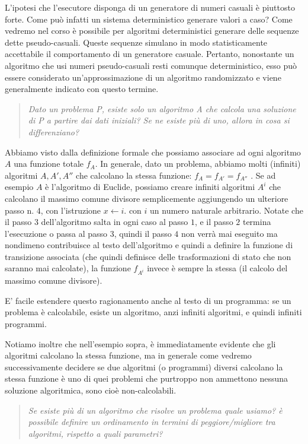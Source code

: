 L'ipotesi che l'esecutore disponga di un generatore di numeri casuali
è piuttosto forte. Come può infatti un sistema deterministico generare
valori a caso? Come vedremo nel corso è possibile per algoritmi
deterministici generare delle sequenze dette pseudo-casuali. Queste
sequenze simulano in modo statisticamente accettabile il comportamento
di un generatore casuale. Pertanto, nonostante un algoritmo che usi
numeri pseudo-casuali resti comunque deterministico, esso può essere
considerato un'approssimazione di un algoritmo randomizzato e viene
generalmente indicato con questo termine.


\begin{quote}\emph{Dato un problema P, esiste solo un algoritmo A che
    calcola una soluzione di P a partire dai dati iniziali? Se ne
    esiste più di uno, allora in cosa si differenziano?}
\end{quote}

Abbiamo visto dalla definizione formale che possiamo associare ad ogni
algoritmo $A$ una funzione totale $f_A$.  In generale, dato un
problema, abbiamo molti (infiniti) algoritmi $A,A',A''$ che calcolano
la stessa funzione: $f_A = f_{A'} = f_{A''}$ . Se ad esempio $A$ è
l'algoritmo di Euclide, possiamo creare infiniti algoritmi $A^i$ che
calcolano il massimo comune divisore semplicemente aggiungendo un
ulteriore passo n. $4$, con l'istruzione $x \leftarrow i.$ con $i$ un
numero naturale arbitrario. Notate che il passo $3$ dell'algoritmo
salta in ogni caso al passo $1$, e il passo $2$ termina l'esecuzione o
passa al passo $3$, quindi il passo $4$ non verrà mai eseguito ma
nondimeno contribuisce al testo dell'algoritmo e quindi a definire la
funzione di transizione associata (che quindi definisce delle
trasformazioni di stato che non saranno mai calcolate), la funzione
$f_{A^i}$ invece è sempre la stessa (il calcolo del massimo comune
divisore).

E' facile estendere questo ragionamento anche al testo di un
programma: se un problema è calcolabile, esiste un algoritmo, anzi
infiniti algoritmi, e quindi infiniti programmi.

Notiamo inoltre che nell'esempio sopra, è immediatamente evidente che
gli algoritmi calcolano la stessa funzione, ma in generale come
vedremo successivamente decidere se due algoritmi (o programmi)
diversi calcolano la stessa funzione è uno di quei problemi che
purtroppo non ammettono nessuna soluzione algoritmica, sono cioè
non-calcolabili.

\begin{quote}\emph{Se esiste più di un algoritmo che risolve un
    problema quale usiamo? è possibile definire un ordinamento in
    termini di peggiore/migliore tra algoritmi, rispetto a quali
    parametri?}
\end{quote}

